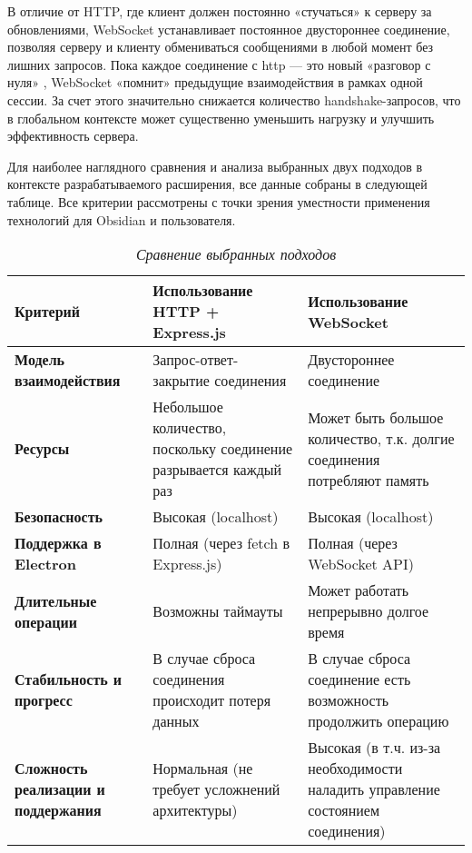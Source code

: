 \documentclass[14pt]{extarticle}
\begin{document}
	В отличие от HTTP, где клиент должен постоянно «стучаться» к серверу за обновлениями, WebSocket устанавливает постоянное двустороннее соединение, позволяя серверу и клиенту обмениваться сообщениями в любой момент без лишних запросов. Пока каждое соединение с http — это новый «разговор с нуля» , WebSocket «помнит» предыдущие взаимодействия в рамках одной сессии. За счет этого значительно снижается количество handshake-запросов, что в глобальном контексте может существенно уменьшить нагрузку и улучшить эффективность сервера. 
	\vspace{1em}
	
	Для наиболее наглядного сравнения и анализа выбранных двух подходов в контексте разрабатываемого расширения, все данные собраны в следующей таблице. Все критерии рассмотрены с точки зрения уместности применения технологий для Obsidian и пользователя.
	\begin{table}[h] 
		\caption{\textit{Сравнение выбранных подходов}} 
		\label{tab:my_label}
		\begin{tabular}{|p{4.5cm}|p{4.5cm}|p{4.5cm}|} 
			\hline
			\textbf{Критерий} & \textbf{Использование HTTP + Express.js} & \textbf{Использование WebSocket }\\ \hline
			\textbf{Модель взаимодействия} & Запрос-ответ-закрытие соединения & Двустороннее соединение \\ \hline
			\textbf{Ресурсы} & Небольшое количество, поскольку соединение разрывается каждый раз & Может быть большое количество, т.к. долгие соединения потребляют память \\ \hline
			\textbf{Безопасность} & Высокая (localhost) & Высокая (localhost) \\ \hline
			\textbf{Поддержка в Electron} & Полная (через fetch в Express.js) & Полная (через WebSocket API) \\ \hline
			\textbf{Длительные операции} & Возможны таймауты & Может работать непрерывно долгое время \\ \hline
			\textbf{Стабильность и прогресс} & В случае сброса соединения происходит потеря данных & В случае сброса соединение есть возможность продолжить операцию \\ \hline
			\textbf{Сложность реализации и поддержания} & Нормальная (не требует усложнений архитектуры)  & Высокая (в т.ч. из-за необходимости наладить управление состоянием соединения) \\ \hline
		\end{tabular}
	\end{table}
	\vspace{1em}
	
\end{document}
